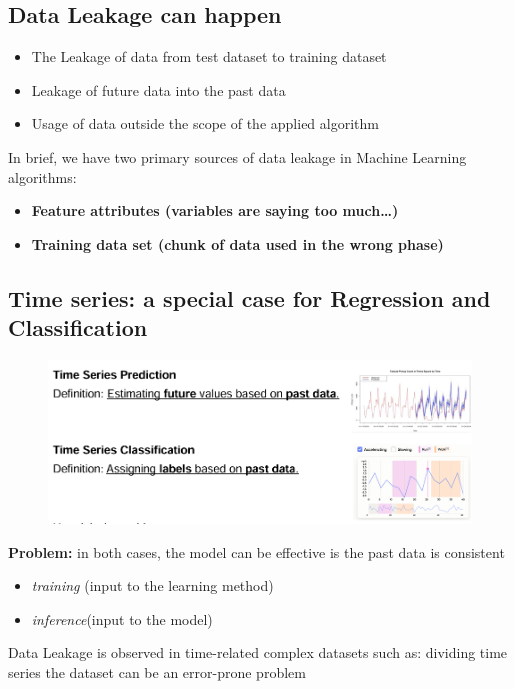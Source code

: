 \subsection{Data Leakage can happen}
\begin{itemize}
    \item The Leakage of data from test dataset to training dataset
    \item Leakage of future data into the past data
    \item  Usage of data outside the scope of the applied algorithm
\end{itemize}


\noindent In brief, we have two primary sources of data leakage in Machine Learning algorithms:
\begin{itemize}
    \item \textbf{Feature attributes (variables are saying too much…) }
    \item \textbf{Training data set (chunk of data used in the wrong phase) }
\end{itemize}

\subsection{Time series: a special case for Regression and Classification}
\begin{figure}[H]
    \centering
    \includegraphics[width=0.8\linewidth]{07-08/images/time series.png}
\end{figure}

\noindent \textbf{Problem:} in both cases, the model can be effective is the past data is consistent 
\begin{itemize}
    \item \textit{training} (input to the learning method)
    \item \textit{inference}(input to the model)
\end{itemize}

\noindent Data Leakage is observed in time-related complex datasets such as: 
dividing time series the dataset can be an error-prone problem

